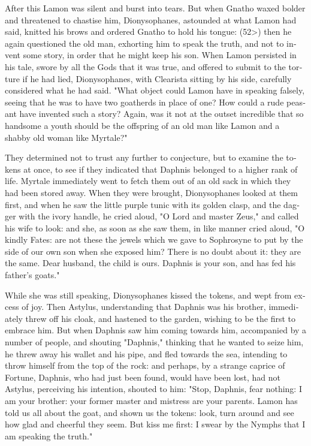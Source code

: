 \documentclass{book}
\begin{document}
\begin{pairs}
\begin{Rightside}
\begin{english}
  After this Lamon was silent and burst into tears.  But when Gnatho waxed bolder and threatened to chastise him, Dionysophanes, astounded at what Lamon had said, knitted his brows and ordered Gnatho to hold his tongue: (52>) then he again questioned the old man, exhorting him to speak the truth, and not to invent some story, in order that he might keep his son.  When Lamon persisted in his tale, swore by all the Gods that it was true, and offered to submit to the torture if he had lied, Dionysophanes, with Clearista sitting by his side, carefully considered what he had said. "What object could Lamon have in speaking falsely, seeing that he was to have two goatherds in place of one?  How could a rude peasant have invented such a story?  Again, was it not at the outset incredible that so handsome a youth should be the offspring of an old man like Lamon and a shabby old woman like Myrtale?"
\pend


  They determined not to trust any further to conjecture, but to examine the tokens at once, to see if they indicated that Daphnis belonged to a higher rank of life.  Myrtale immediately went to fetch them out of an old sack in which they had been stored away.  When they were brought, Dionysophanes looked at them first, and when he saw the little purple tunic with its golden clasp, and the dagger with the ivory handle, he cried aloud, "O Lord and master Zeus," and called his wife to look: and she, as soon as she saw them, in like manner cried aloud, "O kindly Fates: are not these the jewels which we gave to Sophrosyne to put by the side of our own son when she exposed him?  There is no doubt about it: they are the same.  Dear husband, the child is ours.  Daphnis is your son, and has fed his father's goats."
\pend


  While she was still speaking, Dionysophanes kissed the tokens, and wept from excess of joy.  Then Astylus, understanding that Daphnis was his brother, immediately threw off his cloak, and hastened to the garden, wishing to be the first to embrace him.  But when Daphnis saw him coming towards him, accompanied by a number of people, and shouting "Daphnis," thinking that he wanted to seize him, he threw away his wallet and his pipe, and fled towards the sea, intending to throw himself from the top of the rock: and perhaps, by a strange caprice of Fortune, Daphnis, who had just been found, would have been lost, had not Astylus, perceiving his intention, shouted to him: "Stop, Daphnis, fear nothing: I am your brother: your former master and mistress are your parents.  Lamon has told us all about the goat, and shown us the tokens: look, turn around and see how glad and cheerful they seem.  But kiss me first: I swear by the Nymphs that I am speaking the truth."
\pend



\end{english}
\end{Rightside}
\end{pairs}
\end{document}
